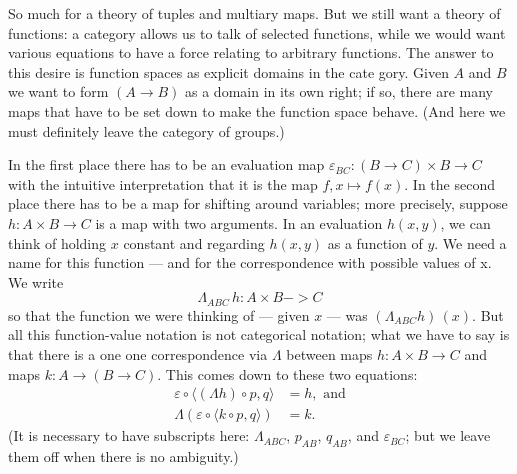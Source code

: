 \documentclass[12pt]{article}
\def\to{\rightarrow}
\def\comp{\circ}
\def\ev{\varepsilon}
\def\ebc{\varepsilon_{BC}}
\def\L{\Lambda}
\begin{document}
So much for a theory of tuples and multiary maps. But we still want a theory of functions: a category allows us to talk of selected functions, while we would want various equations to have a force relating to arbitrary functions. The answer to this desire is function spaces as explicit domains in the cate­ gory. Given $A$ and $B$ we want to form $(A \to B)$ as a domain in its own right; if so, there are many maps that have to be set down to make the function space behave. (And here we must defi­nitely leave the category of groups.)

In the first place there has to be an evaluation map
$\ebc : (B \to C) \times B \to C$ with the intuitive interpretation that it is the map $ f,x \mapsto f(x)$. In the second place there has to be a map for shifting around variables; more precisely, suppose
$h: A\times B \to C$ is a map with two arguments. In an evaluation $h(x,y)$, we can think of holding $x$ constant and regarding $h(x,y)$ as a function of $y$. We need a name for this function --- and for the correspondence with possible values of x. We write
$$
\L_{ABC}\, h : A\times B -> C
$$
%
so that the function we were thinking of --- given $x$ --- was
$(\L_{ABC} h)\, (x)$. But all this function-value notation is not categorical notation; what we have to say is that there is a one one correspondence via $\L$ between maps $h : A\times B \to C$ and maps $k: A \to (B \to C)$. This comes down to these two equations:
%
\begin{align*}
\ev \comp \langle (\L h)\comp p, q\rangle &= h, {\textrm{ and}} \\
\L(\ev \comp \langle k \comp p, q \rangle) &= k.
\end{align*}
%
(It is necessary to have subscripts here: $\L_{ABC}$, $p_{AB}$, $q_{AB}$, and $\ebc$; but we leave them off when there is no ambiguity.)
\end{document}

